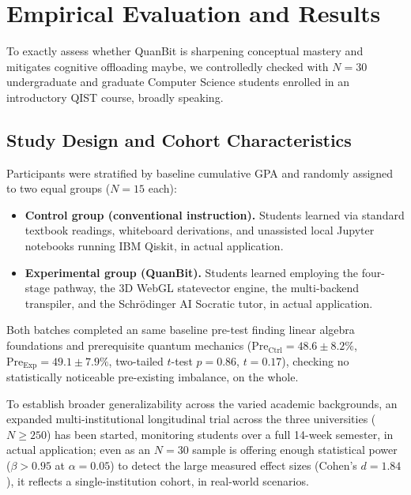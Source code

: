 \documentclass[conference]{IEEEtran}
\begin{document}
\section{Empirical Evaluation and Results}
\label{sec:evaluation}

To exactly assess whether QuanBit is sharpening conceptual mastery and mitigates cognitive offloading maybe, we controlledly checked with $N=30$ undergraduate and graduate Computer Science students enrolled in an introductory QIST course, broadly speaking.

\subsection{Study Design and Cohort Characteristics}
Participants were stratified by baseline cumulative GPA and randomly assigned to two equal groups ($N=15$ each):
\begin{itemize}[leftmargin=*,noitemsep,topsep=1pt]
    \item \textbf{Control group (conventional instruction).} Students learned via standard textbook readings, whiteboard derivations, and unassisted local Jupyter notebooks running IBM Qiskit, in actual application.
    \item \textbf{Experimental group (QuanBit).} Students learned employing the four-stage pathway, the 3D WebGL statevector engine, the multi-backend transpiler, and the Schr{\"o}dinger AI Socratic tutor, in actual application.
\end{itemize}
Both batches completed an same baseline pre-test finding linear algebra foundations and prerequisite quantum mechanics ($\text{Pre}_{\text{Ctrl}} = 48.6 \pm 8.2\%$, $\text{Pre}_{\text{Exp}} = 49.1 \pm 7.9\%$, two-tailed $t$-test $p=0.86$, $t=0.17$), checking no statistically noticeable pre-existing imbalance, on the whole.

To establish broader generalizability across the varied academic backgrounds, an expanded multi-institutional longitudinal trial across the three universities ($N \ge 250$) has been started, monitoring students over a full 14-week semester, in actual application; even as an $N=30$ sample is offering enough statistical power ($\beta > 0.95$ at $\alpha = 0.05$) to detect the large measured effect sizes (Cohen's $d = 1.84$), it reflects a single-institution cohort, in real-world scenarios.
\end{document}
